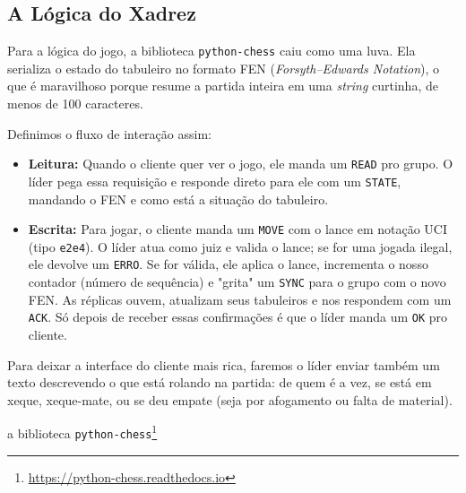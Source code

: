 \subsection*{A Lógica do Xadrez}
Para a lógica do jogo, a biblioteca \texttt{python-chess} caiu como uma luva. Ela serializa o estado do tabuleiro no formato FEN (\textit{Forsyth–Edwards Notation}), o que é maravilhoso porque resume a partida inteira em uma \textit{string} curtinha, de menos de 100 caracteres.

Definimos o fluxo de interação assim:
\begin{itemize}
    \item \textbf{Leitura:} Quando o cliente quer ver o jogo, ele manda um \texttt{READ} pro grupo. O líder pega essa requisição e responde direto para ele com um \texttt{STATE}, mandando o FEN e como está a situação do tabuleiro.
    
    \item \textbf{Escrita:} Para jogar, o cliente manda um \texttt{MOVE} com o lance em notação UCI (tipo \texttt{e2e4}). O líder atua como juiz e valida o lance; se for uma jogada ilegal, ele devolve um \texttt{ERRO}. Se for válida, ele aplica o lance, incrementa o nosso contador (número de sequência) e "grita" um \texttt{SYNC} para o grupo com o novo FEN. As réplicas ouvem, atualizam seus tabuleiros e nos respondem com um \texttt{ACK}. Só depois de receber essas confirmações é que o líder manda um \texttt{OK} pro cliente.
\end{itemize}

Para deixar a interface do cliente mais rica, faremos o líder enviar também um texto descrevendo o que está rolando na partida: de quem é a vez, se está em xeque, xeque-mate, ou se deu empate (seja por afogamento ou falta de material).

a biblioteca \texttt{python-chess}\footnote{\url{https://python-chess.readthedocs.io}}

